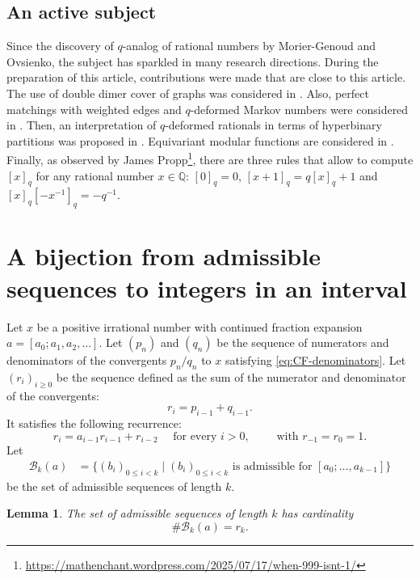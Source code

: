 \documentclass[a4paper,12pt]{amsart}
\newtheorem{lemma}[definition]{Lemma}
\newcommand{\Q}{\mathbb{Q}}
\newcommand{\xx}{{x}}
\newcommand{\Bcal}{{\mathcal{B}}}
\newcommand{\0}{\mathtt{0}}
\newcommand{\1}{\mathtt{1}}
\newcommand{\2}{\mathtt{2}}
\newcommand{\3}{\mathtt{3}}
\begin{document}
\subsection*{An active subject}
Since the discovery of $q$-analog of rational numbers by
Morier-Genoud and Ovsienko, the subject has sparkled in many research directions.
During the preparation of this article, contributions were made that are close to this article.
The use of double dimer cover of graphs was considered in \cite{musiker_super_2025}.
Also, perfect matchings with weighted edges
and $q$-deformed Markov numbers were considered in
\cite{evans_q-deformed_2025}.
Then, an interpretation of
$q$-deformed rationals in terms of
hyperbinary partitions was proposed in
\cite{mcconville_hyperbinary_2025}.
Equivariant modular functions are considered in \cite{topkara_equivariant_2025}.
Finally, as observed by James Propp\footnote{
    \url{https://mathenchant.wordpress.com/2025/07/17/when-999-isnt-1/}},
there are three rules that allow to compute $[\xx]_q$ for any rational number $\xx\in\Q$:
    $[0]_q = 0$,
    $[\xx+1]_q = q[\xx]_q + 1$
    and
    $[\xx]_q [-\xx^{-1}]_q = -q^{-1}$.
%
%
%
%
%


\section{A bijection from admissible sequences to integers in an interval}
\label{sec:bijection-admissible-to-integers}

Let $\xx$ be a positive irrational number
with continued fraction expansion
$a=[a_0; a_1, a_2, \dots]$.
Let $(p_n)$ and $(q_n)$ be the sequence of numerators and denominators of the
convergents $p_n/q_n$ to $\xx$ satisfying \eqref{eq:CF-denominators}.
Let $(r_i)_{i\geq0}$ be the sequence defined as the sum of the numerator and
denominator of the convergents:
\[
    r_i=p_{i-1}+q_{i-1}.
\]
It satisfies the following recurrence:
\begin{equation}\label{eq:the-r-sequence}
    r_i = a_{i-1}r_{i-1} + r_{i-2} \quad\text{ for every } i>0,
\qquad
\text{ with }
r_{-1}=r_0=1.
\end{equation}
Let
    \begin{align*}
        \Bcal_{k}(a)
        &=
        \{(b_i)_{0\leq i< k} \mid
            (b_i)_{0\leq i< k}
            \text{ is admissible for } [a_0;\dots,a_{k-1}]
        \}
    \end{align*}
be the set of admissible sequences of length $k$.

\begin{lemma}\label{lem:cardinality-admissible-sequences}
    The set of admissible sequences of length $k$ has cardinality
    \[
        \#\Bcal_{k}(a)  = r_{k}.
    \]
\end{lemma}
\end{document}
